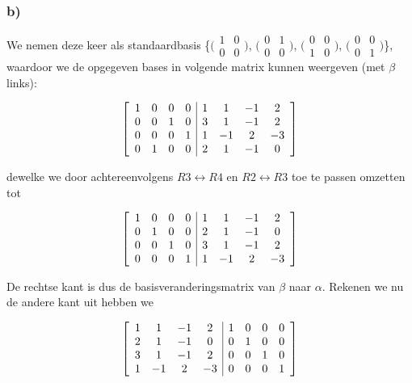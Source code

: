 \documentclass[lineaire_algebra_oplossingen.tex]{subfiles}
\begin{document}
\subsubsection*{b)}

We nemen deze keer als standaardbasis \{$\bigl(
\begin{smallmatrix}
1&0\\ 0&0
\end{smallmatrix}
\bigr)$,
$\bigl(
\begin{smallmatrix}
0&1\\ 0&0
\end{smallmatrix}
\bigr)$,
$\bigl(
\begin{smallmatrix}
0&0\\ 1&0
\end{smallmatrix}
\bigr)$,
$\bigl(
\begin{smallmatrix}
0&0\\ 0&1
\end{smallmatrix}
\bigr)$\}, waardoor we de opgegeven bases in volgende matrix kunnen weergeven (met $\beta$ links):

\[
\left[
\begin{array}{ c c c c | c c c c }
1 & 0 & 0 & 0 & 1 & 1 & -1 & 2\\
0 & 0 & 1 & 0 & 3 & 1 & -1 & 2\\
0 & 0 & 0 & 1 & 1 & -1 & 2 & -3\\
0 & 1 & 0 & 0 & 2 & 1 & -1 & 0
\end{array}
\right]
\]

dewelke we door achtereenvolgens $R3 \leftrightarrow R4$ en $R2 \leftrightarrow R3$ toe te passen omzetten tot

\[
\left[
\begin{array}{ c c c c | c c c c }
1 & 0 & 0 & 0 & 1 & 1 & -1 & 2\\
0 & 1 & 0 & 0 & 2 & 1 & -1 & 0\\
0 & 0 & 1 & 0 & 3 & 1 & -1 & 2\\
0 & 0 & 0 & 1 & 1 & -1 & 2 & -3
\end{array}
\right]
\]

De rechtse kant is dus de basisveranderingsmatrix van $\beta$ naar $\alpha$. Rekenen we nu de andere kant uit hebben we

\[
\left[
\begin{array}{ c c c c | c c c c }
1 & 1 & -1 & 2 & 1 & 0 & 0 & 0\\
2 & 1 & -1 & 0 & 0 & 1 & 0 & 0\\
3 & 1 & -1 & 2 & 0 & 0 & 1 & 0\\
1 & -1 & 2 & -3 & 0 & 0 & 0 & 1
\end{array}
\right]
\]
\end{document}
